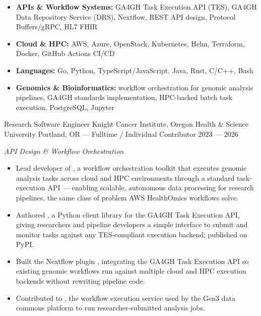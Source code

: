 




\begin{itemize}
    \item \textbf{APIs \& Workflow Systems:} GA4GH Task Execution API (TES), GA4GH Data Repository Service (DRS), Nextflow, REST API design, Protocol Buffers/gRPC, HL7 FHIR
    \item \textbf{Cloud \& HPC:} AWS, Azure, OpenStack, Kubernetes, Helm, Terraform, Docker, GitHub Actions CI/CD
    \item \textbf{Languages:} Go, Python, TypeScript/JavaScript, Java, Rust, C/C++, Bash
    \item \textbf{Genomics \& Bioinformatics:} workflow orchestration for genomic analysis pipelines, GA4GH standards implementation, HPC-backed batch task execution, PostgreSQL, Jupyter
\end{itemize}


\showoff
{Research Software Engineer}
{Knight Cancer Institute, Oregon Health \& Science University}
{Portland, OR --- Fulltime / Individual Contributor}
{2023 --- 2026}

\vspace{0.4em}

\emph{API Design \& Workflow Orchestration}

\begin{itemize}
    \item Lead developer of , a workflow orchestration toolkit that executes genomic analysis tasks across cloud and HPC environments through a standard task-execution API --- enabling scalable, autonomous data processing for research pipelines, the same class of problem AWS HealthOmics workflows solve.
    \item Authored , a Python client library for the GA4GH Task Execution API, giving researchers and pipeline developers a simple interface to submit and monitor tasks against any TES-compliant execution backend; published on PyPI.
    \item Built the Nextflow plugin , integrating the GA4GH Task Execution API so existing genomic workflows run against multiple cloud and HPC execution backends without rewriting pipeline code.
    \item Contributed to , the workflow execution service used by the Gen3 data commons platform to run researcher-submitted analysis jobs.
\end{itemize}

